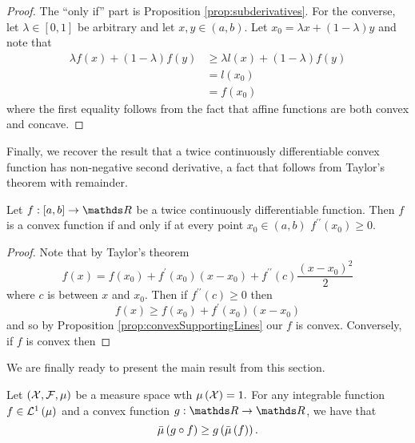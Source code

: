 \begin{proof}
The ``only if'' part is Proposition \ref{prop:subderivatives}.
For the converse, let $\lambda\in\left[0,1\right]$ be arbitrary and
let $x,y\in\left(a,b\right)$. Let $x_{0}=\lambda x+\left(1-\lambda\right)y$
and note that 
\begin{align*}
\lambda f\left(x\right)+\left(1-\lambda\right)f\left(y\right) & \geq\lambda l\left(x\right)+\left(1-\lambda\right)f\left(y\right)\\
 & =l\left(x_{0}\right)\\
 & =f\left(x_{0}\right)
\end{align*}
where the first equality follows from the fact that affine functions
are both convex and concave.
\end{proof}
Finally, we recover the result that a twice continuously differentiable
convex function has non-negative second derivative, a fact that follows
from Taylor's theorem with remainder.
\begin{prop}
\label{prop:convexPositiveSecondDerivative}Let $f:\left[a,b\right]\to\R$
be a twice continuously differentiable function. Then $f$ is a convex
function if and only if at every point $x_{0}\in\left(a,b\right)$
$f^{\prime\prime}\left(x_{0}\right)\geq0$.
\end{prop}

\begin{proof}
Note that by Taylor's theorem
\begin{equation}
f\left(x\right)=f\left(x_{0}\right)+f^{\prime}\left(x_{0}\right)\left(x-x_{0}\right)+f^{\prime\prime}\left(c\right)\frac{\left(x-x_{0}\right)^{2}}{2}\label{eq:taylorConvex}
\end{equation}
where $c$ is between $x$ and $x_{0}$. Then if $f^{\prime\prime}\left(c\right)\geq0$
then
\[
f\left(x\right)\geq f\left(x_{0}\right)+f^{\prime}\left(x_{0}\right)\left(x-x_{0}\right)
\]
and so by Proposition \ref{prop:convexSupportingLines} our $f$ is
convex. Conversely, if $f$ is convex then
\end{proof}
We are finally ready to present the main result from this section.
\begin{thm}
\label{thm:jensenInequality}Let $\left(\mathcal{X},\mathcal{F},\mu\right)$ be a measure space
wth $\mu\left(\mathcal{X}\right)=1.$ For any integrable function $f\in\mathcal{L}^{1}\left(\mu\right)$
and a convex function $g:\R\to\R$, we have that
\[
\bar{\mu}\left(g\circ f\right)\geq g\left(\bar{\mu}\left(f\right)\right).
\]
\end{thm}

